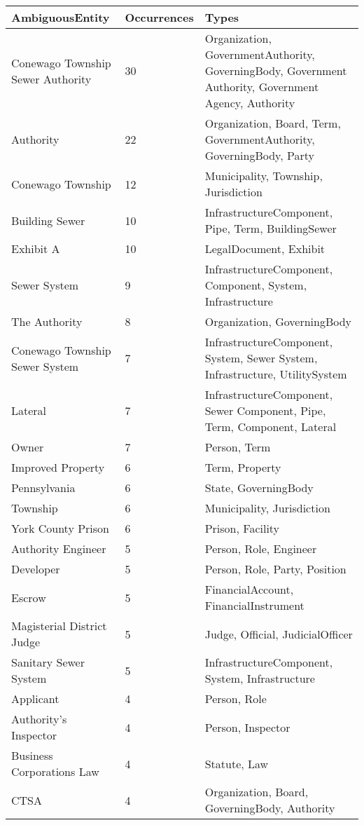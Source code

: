 \begin{longtable}{p{} p{} p{}}
\toprule
\textbf{AmbiguousEntity} & \textbf{Occurrences} & \textbf{Types} \\
\midrule
\endfirsthead
\endhead
Conewago Township Sewer Authority & 30 & Organization, GovernmentAuthority, GoverningBody, Government Authority, Government Agency, Authority \\
Authority & 22 & Organization, Board, Term, GovernmentAuthority, GoverningBody, Party \\
Conewago Township & 12 & Municipality, Township, Jurisdiction \\
Building Sewer & 10 & InfrastructureComponent, Pipe, Term, BuildingSewer \\
Exhibit A & 10 & LegalDocument, Exhibit \\
Sewer System & 9 & InfrastructureComponent, Component, System, Infrastructure \\
The Authority & 8 & Organization, GoverningBody \\
Conewago Township Sewer System & 7 & InfrastructureComponent, System, Sewer System, Infrastructure, UtilitySystem \\
Lateral & 7 & InfrastructureComponent, Sewer Component, Pipe, Term, Component, Lateral \\
Owner & 7 & Person, Term \\
Improved Property & 6 & Term, Property \\
Pennsylvania & 6 & State, GoverningBody \\
Township & 6 & Municipality, Jurisdiction \\
York County Prison & 6 & Prison, Facility \\
Authority Engineer & 5 & Person, Role, Engineer \\
Developer & 5 & Person, Role, Party, Position \\
Escrow & 5 & FinancialAccount, FinancialInstrument \\
Magisterial District Judge & 5 & Judge, Official, JudicialOfficer \\
Sanitary Sewer System & 5 & InfrastructureComponent, System, Infrastructure \\
Applicant & 4 & Person, Role \\
Authority's Inspector & 4 & Person, Inspector \\
Business Corporations Law & 4 & Statute, Law \\
CTSA & 4 & Organization, Board, GoverningBody, Authority \\

\end{longtable}
